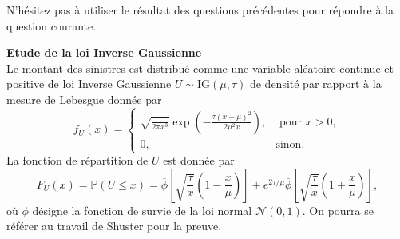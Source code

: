 \documentclass[11pt,addpoints, answers]{exam}
\newcommand{\E}{\mathbb E}            %
\begin{document}
N'hésitez pas à utiliser le résultat des questions précédentes pour répondre à la question courante.
\begin{questions}
\question \textbf{Etude de la loi Inverse Gaussienne}\\

Le montant des sinistres est distribué comme une variable aléatoire continue et positive de loi Inverse Gaussienne $U\sim \text{IG}(\mu, \tau)$ de densité par rapport à la mesure de Lebesgue donnée par
$$
f_{U}(x) =\begin{cases}
\sqrt{\frac{\tau}{2\pi x^3 }}\exp\left(-\frac{\tau(x-\mu)^2}{2\mu^2x}\right),&\text{ pour }x>0,\\
0,&\text{sinon}.
\end{cases}
$$
La fonction de répartition de $U$ est donnée par 
$$
F_U(x) = \mathbb{P}(U\leq x) = \overline{\phi}\left[\sqrt{\frac{\tau}{x}}\left(1-\frac{x}{\mu}\right)\right]+e^{2\tau/\mu}\overline{\phi}\left[\sqrt{\frac{\tau}{x}}\left(1+\frac{x}{\mu}\right)\right],
$$
où $\overline{\phi}$ désigne la fonction de survie de la loi normal $\mathcal{N}(0,1)$. On pourra se référer au travail de Shuster \cite{Shuster1968} pour la preuve.
\end{questions}
\end{document}
